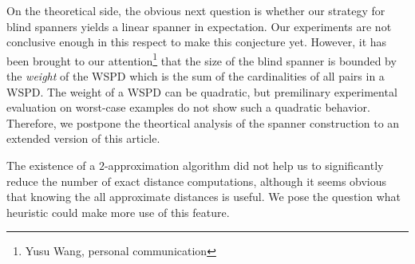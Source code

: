 \documentclass[a4paper,USenglish]{socg-lipics-v2018}
\newcommand{\eps}{\varepsilon}
\newcommand{\ignore}[1]{}
\begin{document}
On the theoretical side, the obvious next question is whether our strategy
for blind spanners yields a linear spanner in expectation. 
Our experiments are not conclusive enough in this respect to make this conjecture yet.
However, it has been brought to our attention\footnote{Yusu Wang, personal communication}
that the size of the blind spanner is bounded by the \emph{weight} of the WSPD
which is the sum of the cardinalities of all pairs in a WSPD.
The weight of a WSPD can be quadratic, but premilinary
experimental evaluation on worst-case examples do not show such a quadratic
behavior. Therefore, we postpone the theortical analysis of the spanner construction
to an extended version of this article.

The existence of a $2$-approximation algorithm did not help us to significantly
reduce the number of exact distance computations, although it seems obvious
that knowing the all approximate distances is useful.
We pose the question what heuristic could make more use of this feature.

\ignore{
We presented experimental evidence showing that in low
doubling dimension we can avoid many distance computations,
if we try to get as much information as possible from the triangle inequality
applied to the previously computed distance. The \textsc{BlindGreedy} spanner
performs especially well, being able to produce  sparse spanners even for small values of  $\eps$.
For the approximate nearest neighbor algorithm we proved a logarithmic upper bound,
and, even though the constant in the proof was very large, we demonstrated
experimentally that this does not show in practice.

The next step on the theoretical side could be proving some upper bound
for blind spanners; it is also interesting to look at other metric space
algorithms and data structures in the setting of expensive distance computation.
On the more applied side, the further development of this approach would
be to find finite spaces of low dimension in practically
important cases, like spaces of persistence diagrams or images endowed with Wasserstein (a.k.a. Earth Movers)
metric. We know that low-dimensional subspaces of functions do not necessarily produce
low-dimensional spaces of persistence diagrams, but there may be some conditions
which guarantee that dimension does not increase too much.
}



\end{document}
